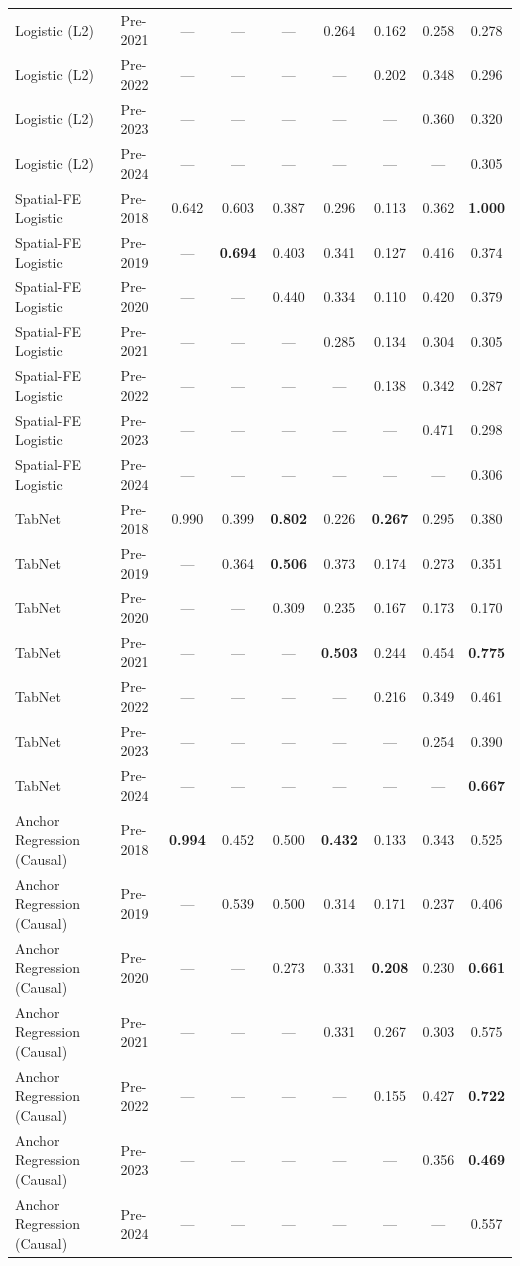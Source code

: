 \begin{table}[htbp]
{\begin{tabular}{l lccccccc}
Logistic (L2) & Pre-2021 & --- & --- & --- & 0.264 & 0.162 & 0.258 & 0.278 \\
Logistic (L2) & Pre-2022 & --- & --- & --- & --- & 0.202 & 0.348 & 0.296 \\
Logistic (L2) & Pre-2023 & --- & --- & --- & --- & --- & 0.360 & 0.320 \\
Logistic (L2) & Pre-2024 & --- & --- & --- & --- & --- & --- & 0.305 \\
Spatial-FE Logistic & Pre-2018 & 0.642 & 0.603 & 0.387 & 0.296 & 0.113 & 0.362 & \textbf{1.000} \\
Spatial-FE Logistic & Pre-2019 & --- & \textbf{0.694} & 0.403 & 0.341 & 0.127 & 0.416 & 0.374 \\
Spatial-FE Logistic & Pre-2020 & --- & --- & 0.440 & 0.334 & 0.110 & 0.420 & 0.379 \\
Spatial-FE Logistic & Pre-2021 & --- & --- & --- & 0.285 & 0.134 & 0.304 & 0.305 \\
Spatial-FE Logistic & Pre-2022 & --- & --- & --- & --- & 0.138 & 0.342 & 0.287 \\
Spatial-FE Logistic & Pre-2023 & --- & --- & --- & --- & --- & 0.471 & 0.298 \\
Spatial-FE Logistic & Pre-2024 & --- & --- & --- & --- & --- & --- & 0.306 \\
TabNet & Pre-2018 & 0.990 & 0.399 & \textbf{0.802} & 0.226 & \textbf{0.267} & 0.295 & 0.380 \\
TabNet & Pre-2019 & --- & 0.364 & \textbf{0.506} & 0.373 & 0.174 & 0.273 & 0.351 \\
TabNet & Pre-2020 & --- & --- & 0.309 & 0.235 & 0.167 & 0.173 & 0.170 \\
TabNet & Pre-2021 & --- & --- & --- & \textbf{0.503} & 0.244 & 0.454 & \textbf{0.775} \\
TabNet & Pre-2022 & --- & --- & --- & --- & 0.216 & 0.349 & 0.461 \\
TabNet & Pre-2023 & --- & --- & --- & --- & --- & 0.254 & 0.390 \\
TabNet & Pre-2024 & --- & --- & --- & --- & --- & --- & \textbf{0.667} \\
Anchor Regression (Causal) & Pre-2018 & \textbf{0.994} & 0.452 & 0.500 & \textbf{0.432} & 0.133 & 0.343 & 0.525 \\
Anchor Regression (Causal) & Pre-2019 & --- & 0.539 & 0.500 & 0.314 & 0.171 & 0.237 & 0.406 \\
Anchor Regression (Causal) & Pre-2020 & --- & --- & 0.273 & 0.331 & \textbf{0.208} & 0.230 & \textbf{0.661} \\
Anchor Regression (Causal) & Pre-2021 & --- & --- & --- & 0.331 & 0.267 & 0.303 & 0.575 \\
Anchor Regression (Causal) & Pre-2022 & --- & --- & --- & --- & 0.155 & 0.427 & \textbf{0.722} \\
Anchor Regression (Causal) & Pre-2023 & --- & --- & --- & --- & --- & 0.356 & \textbf{0.469} \\
Anchor Regression (Causal) & Pre-2024 & --- & --- & --- & --- & --- & --- & 0.557 \\
\bottomrule
\end{tabular}%
}
\end{table}